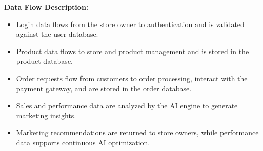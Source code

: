 \textbf{Data Flow Description:}
\begin{itemize}
    \item Login data flows from the store owner to authentication and is validated against the user database.
    \item Product data flows to store and product management and is stored in the product database.
    \item Order requests flow from customers to order processing, interact with the payment gateway, and are stored in the order database.
    \item Sales and performance data are analyzed by the AI engine to generate marketing insights.
    \item Marketing recommendations are returned to store owners, while performance data supports continuous AI optimization.
\end{itemize}
